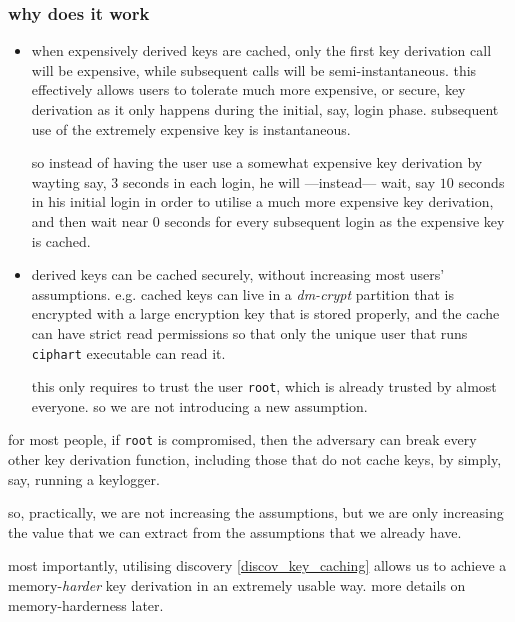 \documentclass[twocolumn]{article}
\begin{document}
\subsubsection{why does it work}
\begin{itemize}
    \item when expensively derived keys are cached, only the first key
    derivation call will be expensive, while subsequent calls will be
    semi-instantaneous.  this effectively allows users to tolerate much
    more expensive, or secure, key derivation as it only happens during the
    initial, say, login phase.  subsequent use of the extremely expensive
    key is instantaneous.

    so instead of having the user use a somewhat expensive key derivation
    by wayting say, $3$ seconds in each login, he will ---instead--- wait,
    say $10$ seconds in his initial login in order to utilise a much more
    expensive key derivation, and then wait near $0$ seconds for every
    subsequent login as the expensive key is cached.

    \item derived keys can be cached securely, without increasing most
    users' assumptions.  e.g. cached keys can live in a \emph{dm-crypt}
    partition that is encrypted with a large encryption key that is stored
    properly, and the cache can have strict read permissions so that only
    the unique user that runs \texttt{ciphart} executable can read it.

    this only requires to trust the user \texttt{root}, which is already
    trusted by almost everyone.  so we are not introducing a new
    assumption.
\end{itemize}

for most people, if \texttt{root} is compromised, then the adversary
can break every other key derivation function, including those that do
not cache keys, by simply, say, running a keylogger.

so, practically, we are not increasing the assumptions, but we are only
increasing the value that we can extract from the assumptions that we
already have.

most importantly, utilising discovery \ref{discov_key_caching} allows us to
achieve a memory-\emph{harder} key derivation in an extremely  usable way.
more details on memory-harderness later.
\end{document}
